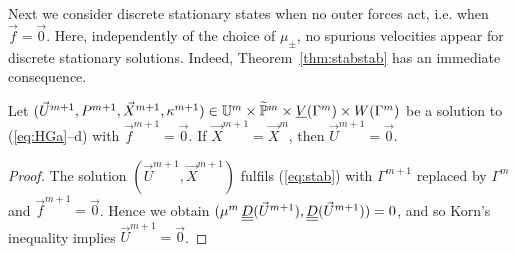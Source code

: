 Next we consider discrete stationary states when no outer forces act, i.e. when
$\vec f = \vec 0$. Here, independently of the choice of $\mu_\pm$, no spurious
velocities appear for discrete stationary solutions. Indeed,
Theorem~\ref{thm:stabstab} has an immediate consequence.
\begin{theorem}\label{thm:stat1}
Let $(\vec U^{m+1},P^{m+1},\vec{X}^{m+1}, \kappa^{m+1}) \in \mathbb{U}^m\times
\widetilde{\mathbb{P}}^m \times \underline{V}(\Gamma^m) \times W(\Gamma^m)$ be a solution to  (\ref{eq:HGa}--d) with
$\vec f^{m+1} = \vec 0$. If $\vec X^{m+1} = \vec X^m$, then $\vec U^{m+1} = \vec
0$.
\end{theorem}
\begin{proof}
The solution $(\vec U^{m+1}, \vec X^{m+1})$ fulfils (\ref{eq:stab}) with
$\Gamma^{m+1}$ replaced by $\Gamma^m$ and  $\vec f^{m+1} = \vec 0$. Hence we
obtain $(\mu^m\,\mat D (\vec U^{m+1}), \mat D(\vec U^{m+1})) = 0$, and so Korn's
inequality implies $\vec U^{m+1} = \vec 0$.
\end{proof}

